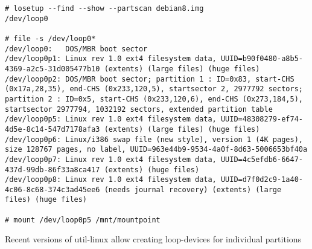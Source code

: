 


\begin{frame}[fragile]
    \begin{listing}[H]
        \begin{verbatim}
# losetup --find --show --partscan debian8.img
/dev/loop0

# file -s /dev/loop0*
/dev/loop0:   DOS/MBR boot sector
/dev/loop0p1: Linux rev 1.0 ext4 filesystem data, UUID=b90f0480-a8b5-4369-a2c5-31d005477b10 (extents) (large files) (huge files)
/dev/loop0p2: DOS/MBR boot sector; partition 1 : ID=0x83, start-CHS (0x17a,28,35), end-CHS (0x233,120,5), startsector 2, 2977792 sectors; partition 2 : ID=0x5, start-CHS (0x233,120,6), end-CHS (0x273,184,5), startsector 2977794, 1032192 sectors, extended partition table
/dev/loop0p5: Linux rev 1.0 ext4 filesystem data, UUID=48308279-ef74-4d5e-8c14-547d7178afa3 (extents) (large files) (huge files)
/dev/loop0p6: Linux/i386 swap file (new style), version 1 (4K pages), size 128767 pages, no label, UUID=963e44b9-9534-4a0f-8d63-5006653bf40a
/dev/loop0p7: Linux rev 1.0 ext4 filesystem data, UUID=4c5efdb6-6647-437d-99db-86f33a8ca417 (extents) (huge files)
/dev/loop0p8: Linux rev 1.0 ext4 filesystem data, UUID=d7f0d2c9-1a40-4c06-8c68-374c3ad45ee6 (needs journal recovery) (extents) (large files) (huge files)

# mount /dev/loop0p5 /mnt/mountpoint
        \end{verbatim}
    
        \caption{Recent versions of util-linux allow creating loop-devices for individual partitions}

        \label{lst:mount_loop}
    \end{listing}
    



\end{frame}


